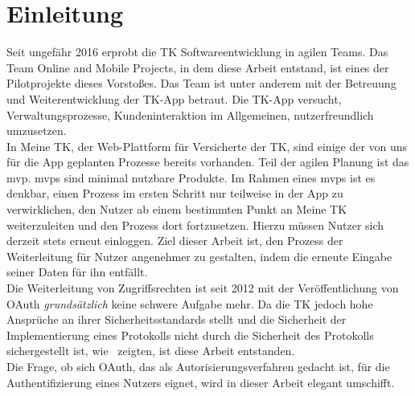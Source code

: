 \chapter{Einleitung} Seit ungefähr 2016 erprobt die TK Softwareentwicklung in
agilen Teams. Das Team Online and Mobile Projects, in dem diese Arbeit entstand,
ist eines der Pilotprojekte dieses Vorstoßes. Das Team ist unter anderem mit der
Betreuung und Weiterentwicklung der TK-App betraut. Die TK-App versucht,
Verwaltungsprozesse, Kundeninteraktion im Allgemeinen, nutzerfreundlich
umzusetzen.\\ In Meine TK, der Web-Plattform für Versicherte der TK, sind einige
der von uns für die App geplanten Prozesse bereits vorhanden. Teil der agilen
Planung ist das \gls{mvp}. \glspl{mvp} sind minimal nutzbare Produkte. Im Rahmen
eines  \gls{mvp}s ist es denkbar, einen Prozess im ersten Schritt nur teilweise
in der App zu verwirklichen, den Nutzer ab einem bestimmten Punkt an Meine TK
weiterzuleiten und den Prozess dort fortzusetzen. Hierzu müssen Nutzer sich
derzeit stets erneut einloggen. Ziel dieser Arbeit ist, den Prozess der
Weiterleitung für Nutzer angenehmer zu gestalten, indem die erneute Eingabe
seiner Daten für ihn entfällt.\\ Die Weiterleitung von Zugriffsrechten ist seit
2012 mit der Veröffentlichung von \gls{OAuth}
\textit{grundsätzlich} keine schwere Aufgabe mehr. Da die TK jedoch hohe
Ansprüche an ihrer Sicherheitsstandards stellt und die Sicherheit der
Implementierung eines Protokolls nicht durch die Sicherheit des Protokolls
sichergestellt ist, wie~\cite{Sun.2012,Hu.2014,Yang.2016} zeigten, ist diese
Arbeit entstanden.\\ Die Frage, ob sich OAuth, das als Autorisierungsverfahren
gedacht ist, für die Authentifizierung eines Nutzers eignet, wird in dieser
Arbeit elegant umschifft.
